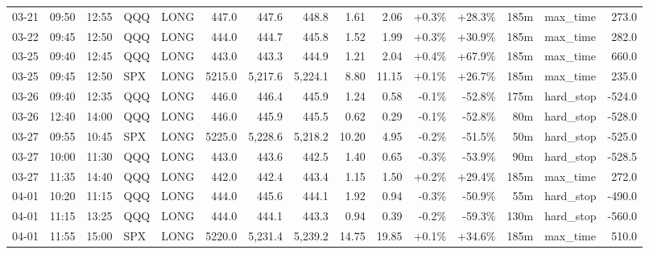 \documentclass[11pt,a4paper,twoside]{article}
\begin{document}
\begin{landscape}
\begin{center}
\begin{longtable}{>{\color{txtmain}}l l l l l r r r r r r r r >{\color{txtmain}}l r}
03-21 & 09:50 & 12:55 & QQQ & LONG & 447.0 & 447.6 & 448.8 & 1.61 & 2.06 & \textcolor{wingreen}{+0.3\%} & \textcolor{wingreen}{+28.3\%} & 185m & max\_time & \textcolor{wingreen}{273.0} \\
03-22 & 09:45 & 12:50 & QQQ & LONG & 444.0 & 444.7 & 445.8 & 1.52 & 1.99 & \textcolor{wingreen}{+0.3\%} & \textcolor{wingreen}{+30.9\%} & 185m & max\_time & \textcolor{wingreen}{282.0} \\
03-25 & 09:40 & 12:45 & QQQ & LONG & 443.0 & 443.3 & 444.9 & 1.21 & 2.04 & \textcolor{wingreen}{+0.4\%} & \textcolor{wingreen}{+67.9\%} & 185m & max\_time & \textcolor{wingreen}{660.0} \\
03-25 & 09:45 & 12:50 & SPX & LONG & 5215.0 & 5,217.6 & 5,224.1 & 8.80 & 11.15 & \textcolor{wingreen}{+0.1\%} & \textcolor{wingreen}{+26.7\%} & 185m & max\_time & \textcolor{wingreen}{235.0} \\
03-26 & 09:40 & 12:35 & QQQ & LONG & 446.0 & 446.4 & 445.9 & 1.24 & 0.58 & \textcolor{lossred}{-0.1\%} & \textcolor{lossred}{-52.8\%} & 175m & hard\_stop & \textcolor{lossred}{-524.0} \\
03-26 & 12:40 & 14:00 & QQQ & LONG & 446.0 & 445.9 & 445.5 & 0.62 & 0.29 & \textcolor{lossred}{-0.1\%} & \textcolor{lossred}{-52.8\%} & 80m & hard\_stop & \textcolor{lossred}{-528.0} \\
03-27 & 09:55 & 10:45 & SPX & LONG & 5225.0 & 5,228.6 & 5,218.2 & 10.20 & 4.95 & \textcolor{lossred}{-0.2\%} & \textcolor{lossred}{-51.5\%} & 50m & hard\_stop & \textcolor{lossred}{-525.0} \\
03-27 & 10:00 & 11:30 & QQQ & LONG & 443.0 & 443.6 & 442.5 & 1.40 & 0.65 & \textcolor{lossred}{-0.3\%} & \textcolor{lossred}{-53.9\%} & 90m & hard\_stop & \textcolor{lossred}{-528.5} \\
03-27 & 11:35 & 14:40 & QQQ & LONG & 442.0 & 442.4 & 443.4 & 1.15 & 1.50 & \textcolor{wingreen}{+0.2\%} & \textcolor{wingreen}{+29.4\%} & 185m & max\_time & \textcolor{wingreen}{272.0} \\
04-01 & 10:20 & 11:15 & QQQ & LONG & 444.0 & 445.6 & 444.1 & 1.92 & 0.94 & \textcolor{lossred}{-0.3\%} & \textcolor{lossred}{-50.9\%} & 55m & hard\_stop & \textcolor{lossred}{-490.0} \\
04-01 & 11:15 & 13:25 & QQQ & LONG & 444.0 & 444.1 & 443.3 & 0.94 & 0.39 & \textcolor{lossred}{-0.2\%} & \textcolor{lossred}{-59.3\%} & 130m & hard\_stop & \textcolor{lossred}{-560.0} \\
04-01 & 11:55 & 15:00 & SPX & LONG & 5220.0 & 5,231.4 & 5,239.2 & 14.75 & 19.85 & \textcolor{wingreen}{+0.1\%} & \textcolor{wingreen}{+34.6\%} & 185m & max\_time & \textcolor{wingreen}{510.0} \\

\end{longtable}
\end{center}
\end{landscape}
\end{document}
